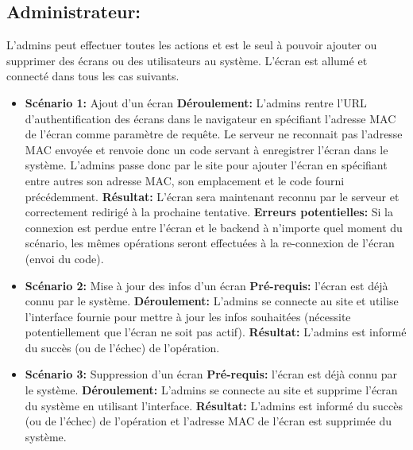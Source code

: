 \documentclass[french]{article}
\begin{document}
	\subsection{Administrateur:}
	L'admins peut effectuer toutes les actions et est le seul à pouvoir ajouter ou supprimer des écrans ou des utilisateurs au système. L'écran est allumé et connecté dans tous les cas suivants. \newline
		\begin{itemize}
		\item \textbf{Scénario 1:} Ajout d'un écran\newline
		\textbf{Déroulement:} L'admins rentre l'URL d'authentification des écrans dans le navigateur en spécifiant l'adresse MAC de l'écran comme paramètre de requête. Le serveur ne reconnait pas l'adresse MAC envoyée et renvoie donc un code servant à enregistrer l'écran dans le système. L'admins passe donc par le site pour ajouter l'écran en spécifiant entre autres son adresse MAC, son emplacement et le code fourni précédemment.\newline
		\textbf{Résultat:} L'écran sera maintenant reconnu par le serveur et correctement redirigé à la prochaine tentative.\newline
		\textbf{Erreurs potentielles:} Si la connexion est perdue entre l'écran et le backend à n'importe quel moment du scénario, les mêmes opérations seront effectuées à la re-connexion de l'écran (envoi du code). \newline
		
		\item \textbf{Scénario 2:} Mise à jour des infos d'un écran\newline
		\textbf{Pré-requis:} l'écran est déjà connu par le système.\newline
		\textbf{Déroulement:} L'admins se connecte au site et utilise l'interface fournie pour mettre à jour les infos souhaitées (nécessite potentiellement que l'écran ne soit pas actif).\newline
		\textbf{Résultat:} L'admins est informé du succès (ou de l'échec) de l'opération.\newline
		
		\item \textbf{Scénario 3:} Suppression d'un écran\newline
		\textbf{Pré-requis:} l'écran est déjà connu par le système.\newline
		\textbf{Déroulement:} L'admins se connecte au site et supprime l'écran du système en utilisant l'interface.\newline
		\textbf{Résultat:} L'admins est informé du succès (ou de l'échec) de l'opération et l'adresse MAC de l'écran est supprimée du système.\newline


\end{itemize}
\end{document}

